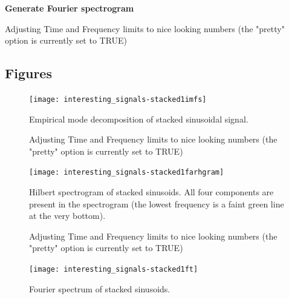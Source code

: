 \documentclass[12pt]{article}
\begin{document}
\textbf{Generate Fourier spectrogram}

\begin{Schunk}
\begin{Soutput}
Adjusting Time and Frequency limits to nice looking numbers (the "pretty" option is currently set to TRUE)
\end{Soutput}
\end{Schunk}

\FloatBarrier

\subsection{Figures}

\begin{figure}[ht]
\begin{center}
\texttt{[image: interesting\_signals-stacked1imfs]}
\end{center}
\caption{Empirical mode decomposition of stacked sinusoidal signal.}
\label{fig:stacked1imfs}
\end{figure}

\begin{figure}[ht]
\begin{center}
\begin{Schunk}
\begin{Soutput}
Adjusting Time and Frequency limits to nice looking numbers (the "pretty" option is currently set to TRUE)
\end{Soutput}
\end{Schunk}
\texttt{[image: interesting\_signals-stacked1farhgram]}
\end{center}
\caption{Hilbert spectrogram of stacked sinusoids.  All four components are present in the spectrogram (the lowest frequency is a faint green line at the very bottom).}
\label{fig:stacked1farhgram}
\end{figure}

\begin{figure}[ht]
\begin{center}
\begin{Schunk}
\begin{Soutput}
Adjusting Time and Frequency limits to nice looking numbers (the "pretty" option is currently set to TRUE)
\end{Soutput}
\end{Schunk}
\texttt{[image: interesting\_signals-stacked1ft]}
\end{center}
\caption{Fourier spectrum of stacked sinusoids.}
\label{fig:stacked1ft}
\end{figure}
\end{document}
